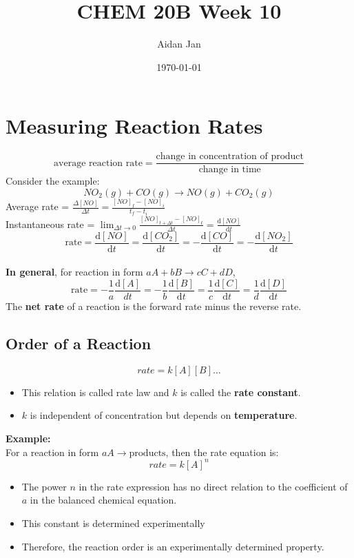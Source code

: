 \documentclass[10pt]{article}
\title{CHEM 20B Week 10}
\author{Aidan Jan}
\date{\today}
\newcommand{\der}{\text{d}}
\begin{document}
\maketitle

\section*{Measuring Reaction Rates}
\[\text{average reaction rate} = \frac{\text{change in concentration of product}}{\text{change in time}}\]
Consider the example:
\[NO_2(g) + CO(g) \rightarrow NO(g) + CO_2(g)\]
Average rate = $\frac{\Delta [NO]}{\Delta t} = \frac{[NO]_f - [NO]_i}{t_f - t_i}$\\
Instantaneous rate = $\lim_{\Delta t \rightarrow 0} \frac{[NO]_{t + \Delta t} - [NO]_t}{\Delta t} = \frac{\der [NO]}{\der t}$\\
\[\text{rate} = \frac{\der[NO]}{\der t} = \frac{\der [CO_2]}{\der t} = -\frac{\der [CO]}{\der t} = -\frac{\der[NO_2]}{\der t}\]
\\\textbf{In general}, for reaction in form $aA + bB \rightarrow cC + dD$,
\[\text{rate} = -\frac{1}{a}\frac{\der [A]}{dt} = -\frac{1}{b}\frac{\der [B]}{\der t} = \frac{1}{c}\frac{\der[C]}{\der t} = \frac{1}{d}\frac{\der[D]}{\der t}\]
The \textbf{net rate} of a reaction is the forward rate minus the reverse rate.

\subsection*{Order of a Reaction}
\[rate = k[A][B]\dots\]
\begin{itemize}
    \item This relation is called rate law and $k$ is called the \textbf{rate constant}.
    \item $k$ is independent of concentration but depends on \textbf{temperature}.
\end{itemize}
\textbf{Example:}\\
For a reaction in form $aA \rightarrow \text{products}$, then the rate equation is:
\[rate = k[A]^n\]
\begin{itemize}
    \item The power $n$ in the rate expression has no direct relation to the coefficient of $a$ in the balanced chemical equation.
    \item This constant is determined experimentally
    \item Therefore, the reaction order is an experimentally determined property.
\end{itemize}
\end{document}

